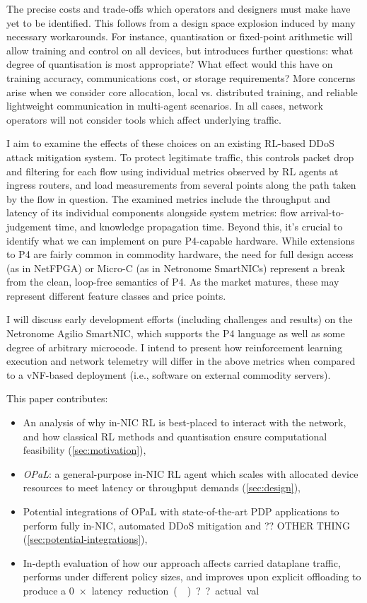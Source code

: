 \documentclass[sigconf,natbib=false]{acmart}
\newcommand{\approachshort}{OPaL}
\begin{document}
The precise costs and trade-offs which operators and designers must make have yet to be identified. This follows from a design space explosion induced by many necessary workarounds. For instance, quantisation or fixed-point arithmetic will allow training and control on all devices, but introduces further questions: what degree of quantisation is most appropriate? What effect would this have on training accuracy, communications cost, or storage requirements? More concerns arise when we consider core allocation, local vs. distributed training, and reliable lightweight communication in multi-agent scenarios. In all cases, network operators will not consider tools which affect underlying traffic.

I aim to examine the effects of these choices on an existing RL-based DDoS attack mitigation system. To protect legitimate traffic, this controls packet drop and filtering for each flow using individual metrics observed by RL agents at ingress routers, and load measurements from several points along the path taken by the flow in question. The examined metrics include the throughput and latency of its individual components alongside system metrics: flow arrival-to-judgement time, and knowledge propagation time. Beyond this, it's crucial to identify what we can implement on pure P4-capable hardware. While extensions to P4 are fairly common in commodity hardware, the need for full design access (as in NetFPGA) or Micro-C (as in Netronome SmartNICs) represent a break from the clean, loop-free semantics of P4. As the market matures, these may represent different feature classes and price points.

I will discuss early development efforts (including challenges and results) on the Netronome Agilio SmartNIC, which supports the P4 language as well as some degree of arbitrary microcode. I intend to present how reinforcement learning execution and network telemetry will differ in the above metrics when compared to a vNF-based deployment (i.e., software on external commodity servers).

This paper contributes:
\begin{itemize}
	\item An analysis of why in-NIC RL is best-placed to interact with the network, and how classical RL methods and quantisation ensure computational feasibility (\cref{sec:motivation}),
	\item \emph{\approachshort{}}: a general-purpose in-NIC RL agent which scales with allocated device resources to meet latency or throughput demands (\cref{sec:design}),
	\item Potential integrations of \approachshort{} with state-of-the-art PDP applications to perform fully in-NIC, automated DDoS mitigation and ?? OTHER THING (\cref{sec:potential-integrations}),
	\item In-depth evaluation of how our approach affects carried dataplane traffic, performs under different policy sizes, and improves upon explicit offloading to produce a \SI{0}{$\times$} latency reduction (). ??actual val
\end{itemize}
\end{document}
